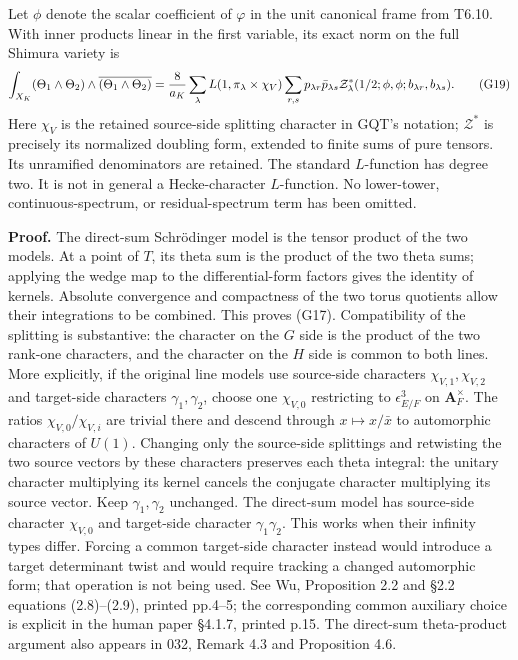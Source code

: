 \documentclass[11pt,a4paper]{article}
\theoremstyle{definition}
\begin{document}
Let \(\phi\) denote the scalar coefficient of \(\varphi\) in the unit canonical frame from T6.10. With inner products linear in the first variable, its exact norm on the full Shimura variety is \[
\int_{X_K}(\Theta_1\wedge\Theta_2)\wedge
                 \overline{(\Theta_1\wedge\Theta_2)}
={8\over a_K}\sum_\lambda L(1,\pi_\lambda\times\chi_V)
\sum_{r,s}p_{\lambda r}\bar p_{\lambda s}
\mathcal Z^*_{\lambda}(1/2;\phi,\phi;b_{\lambda r},b_{\lambda s}).
\tag{G19}
\] Here \(\chi_V\) is the retained source-side splitting character in GQT's notation; \(\mathcal Z^*\) is precisely its normalized doubling form, extended to finite sums of pure tensors. Its unramified denominators are retained. The standard \(L\)-function has degree two. It is not in general a Hecke-character \(L\)-function. No lower-tower, continuous-spectrum, or residual-spectrum term has been omitted.

\textbf{Proof.} The direct-sum Schrödinger model is the tensor product of the two models. At a point of \(T\), its theta sum is the product of the two theta sums; applying the wedge map to the differential-form factors gives the identity of kernels. Absolute convergence and compactness of the two torus quotients allow their integrations to be combined. This proves (G17). Compatibility of the splitting is substantive: the character on the \(G\) side is the product of the two rank-one characters, and the character on the \(H\) side is common to both lines. More explicitly, if the original line models use source-side characters \(\chi_{V,1},\chi_{V,2}\) and target-side characters \(\gamma_1,\gamma_2\), choose one \(\chi_{V,0}\) restricting to \(\epsilon_{E/F}^{3}\) on \(\mathbf A_F^\times\). The ratios \(\chi_{V,0}/\chi_{V,i}\) are trivial there and descend through \(x\mapsto x/\bar x\) to automorphic characters of \(U(1)\). Changing only the source-side splittings and retwisting the two source vectors by these characters preserves each theta integral: the unitary character multiplying its kernel cancels the conjugate character multiplying its source vector. Keep \(\gamma_1,\gamma_2\) unchanged. The direct-sum model has source-side character \(\chi_{V,0}\) and target-side character \(\gamma_1\gamma_2\). This works when their infinity types differ. Forcing a common target-side character instead would introduce a target determinant twist and would require tracking a changed automorphic form; that operation is not being used. See Wu, Proposition 2.2 and §2.2 equations (2.8)--(2.9), printed pp.4--5; the corresponding common auxiliary choice is explicit in the human paper §4.1.7, printed p.15. The direct-sum theta-product argument also appears in 032, Remark 4.3 and Proposition 4.6.
\end{document}
